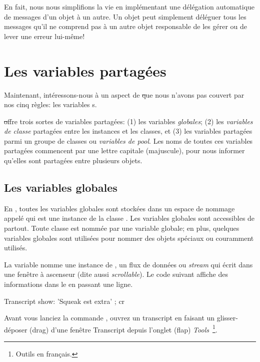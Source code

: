 \documentclass[a4paper,10pt,twoside]{book}
\begin{document}
En fait, nous nous simplifions la vie en impl\'ementant une 
d\'el\'egation automatique de messages d'un objet \`a un autre.
Un objet  peut simplement d\'el\'eguer tous les messages
qu'il ne comprend pas \`a un autre objet responsable de les g\'erer ou
de lever une erreur lui-m\^eme!

\section{Les variables partag\'ees}

Maintenant, int\'eressons-nous \`a un aspect de \st que nous n'avons pas couvert
par nos cinq r\`egles: les variables s.

\st offre trois sortes de variables partag\'ees: (1) les variables \emph{globales}; (2) les \emph{variables de classe} partag\'ees entre les instances et les classes, et (3) les variables partag\'ees parmi un groupe de classes ou \emph{variables de pool}.  Les noms de toutes ces variables partag\'ees commencent par une lettre capitale (majuscule), pour nous informer qu'elles sont partag\'ees entre plusieurs objets.

\subsection{Les variables globales}
En \squeak, toutes les variables globales sont stock\'ees dans un espace de nommage appel\'e  qui est une instance de la classe .
Les variables globales sont accessibles de partout.
Toute classe est nomm\'ee par une variable globale; en plus, quelques variables globales sont utilis\'ees pour nommer des objets sp\'eciaux ou couramment utilis\'es.  

La variable  nomme une instance de , un flux de donn\'ees ou \emph{stream} qui \'ecrit dans une fen\^etre 
\`a ascenseur (dite aussi \emph{scrollable}).
Le code suivant affiche des informations dans le  en passant une ligne.

\begin{code}{}
Transcript show: 'Squeak est extra' ; cr
\end{code}

\noindent
Avant vous lanciez la commande , ouvrez un transcript en faisant un glisser-d\'eposer (drag) d'une fen\^etre Transcript depuis l'onglet (flap) \emph{Tools}~\footnote{Outils en fran\c{c}ais.}.
\end{document}
